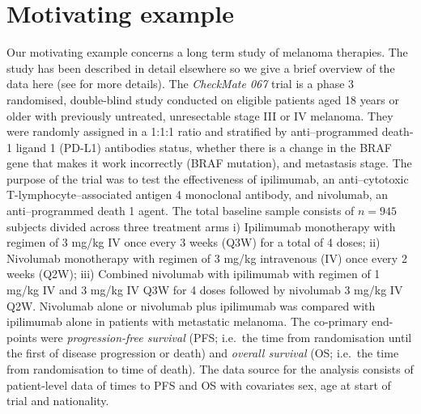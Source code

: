 \documentclass[AMA,STIX1COL]{WileyNJD-v2}
\begin{document}
\section{Motivating example}\label{sec:example}
Our motivating example concerns a long term study of melanoma therapies.
The study has been described in detail elsewhere so we give a brief overview of the data here (see \citep{Wolchok2017, Larkin2019, Hodi2018} for more details).
The \textit{CheckMate 067} trial is a phase 3 randomised, double-blind study conducted on eligible patients aged 18 years or older with previously untreated, unresectable stage III or IV melanoma.
They were randomly assigned in a 1:1:1 ratio and stratified by anti–programmed death-1 ligand 1 (PD-L1) antibodies status, whether there is a change in the BRAF gene that makes it work incorrectly (BRAF mutation), and metastasis stage.
The purpose of the trial was to test the effectiveness of ipilimumab, an anti–cytotoxic T-lymphocyte–associated antigen 4 monoclonal antibody, and nivolumab, an anti–programmed death 1 agent.
The total baseline sample consists of $n = 945$ subjects divided across three treatment arms
i) Ipilimumab monotherapy with regimen of 3 mg/kg IV once every 3 weeks (Q3W) for a total of 4 doses;
ii) Nivolumab monotherapy with regimen of 3 mg/kg intravenous (IV) once every 2 weeks (Q2W);
iii) Combined nivolumab with ipilimumab with regimen of 1 mg/kg IV and 3 mg/kg IV Q3W for 4 doses followed by nivolumab 3 mg/kg IV Q2W.
Nivolumab alone or nivolumab plus ipilimumab was compared with ipilimumab alone in patients with metastatic melanoma.
The co-primary end-points were \textit{progression-free survival} (PFS; i.e.~the time from randomisation until the first of disease progression or death) and \textit{overall survival} (OS; i.e.~the time from randomisation to time of death).
The data source for the analysis consists of patient-level data of times to PFS and OS with covariates sex, age at start of trial and nationality.
\end{document}
